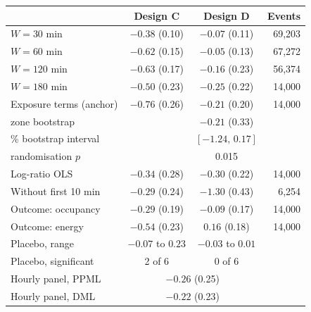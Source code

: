 \begin{table}
{\tblfont
\begin{tabular*}{\linewidth}{@{\extracolsep{\fill}}lccr@{}}
\toprule
 & Design C & Design D & Events \\
\midrule
$W=30$ min & $-0.38$ (0.10) & $-0.07$ (0.11) & 69{,}203 \\
$W=60$ min & $-0.62$ (0.15) & $-0.05$ (0.13) & 67{,}272 \\
$W=120$ min & $-0.63$ (0.17) & $-0.16$ (0.23) & 56{,}374 \\
$W=180$ min & $-0.50$ (0.23) & $-0.25$ (0.22) & 14{,}000 \\
\addlinespace[2pt]
Exposure terms (anchor) & $-0.76$ (0.26) & $-0.21$ (0.20) & 14{,}000 \\
\quad zone bootstrap & & $-0.21$ (0.33) & \\
\quad 95\% bootstrap interval & & $[-1.24,\,0.17]$ & \\
\quad randomisation $p$ & & 0.015 & \\
Log-ratio OLS & $-0.34$ (0.28) & $-0.30$ (0.22) & 14{,}000 \\
Without first 10 min & $-0.29$ (0.24) & $-1.30$ (0.43) & 6{,}254 \\
Outcome: occupancy & $-0.29$ (0.19) & $-0.09$ (0.17) & 14{,}000 \\
Outcome: energy & $-0.54$ (0.23) & $0.16$ (0.18) & 14{,}000 \\
\addlinespace[2pt]
Placebo, range & $-0.07$ to $0.23$ & $-0.03$ to $0.01$ & \\
Placebo, significant & 2 of 6 & 0 of 6 & \\
\addlinespace[2pt]
Hourly panel, PPML & \multicolumn{2}{c}{$-0.26$ (0.25)} & \\
Hourly panel, DML & \multicolumn{2}{c}{$-0.22$ (0.23)} & \\
\bottomrule
\end{tabular*}\par}
\end{table}
